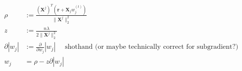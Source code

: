 \newcommand{\matrix}[1]{\mathbf{#1}}
\newcommand{\vector}[1]{\mathbf{#1}}
\newcommand{\X}{\matrix{X}}
\newcommand{\y}{\vector{y}}
\newcommand{\w}{\vector{w}}
\newcommand{\r}{\vector{r}}
\begin{align*}
\rho &:= \frac{(\X^j)^T (\r + \X_j w_j^{(t)})}{{\|\X^j\|_2^2}} \\
z &:= \frac{n \lambda}{2 {\|\X^j\|_2^2}} \\
\partial |w_j| &:= \frac{\partial}{\partial w_j}|w_j| \quad \text{ shothand (or maybe technically correct for subgradient?)} \\
w_j &= \rho - z \partial |w_j| \\
\end{align*}
